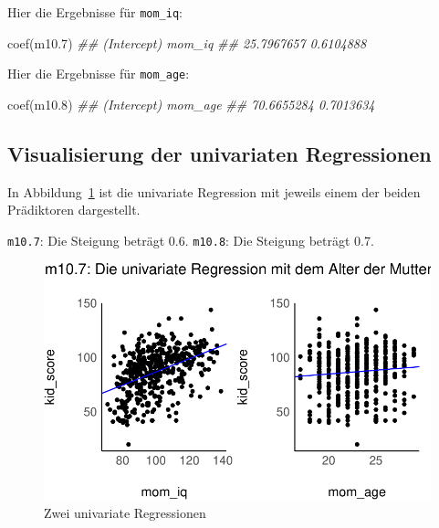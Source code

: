 \documentclass[
  a4paper,
  DIV=11]{scrreprt}
\newenvironment{Shaded}{\begin{snugshade}}{\end{snugshade}}
\newcommand{\DocumentationTok}[1]{\textcolor[rgb]{0.37,0.37,0.37}{\textit{#1}}}
\newcommand{\FloatTok}[1]{\textcolor[rgb]{0.68,0.00,0.00}{#1}}
\newcommand{\FunctionTok}[1]{\textcolor[rgb]{0.28,0.35,0.67}{#1}}
\newcommand{\NormalTok}[1]{\textcolor[rgb]{0.00,0.23,0.31}{#1}}
\theoremstyle{definition}
\theoremstyle{remark}
\begin{document}
Hier die Ergebnisse für \texttt{mom\_iq}:

\begin{Shaded}
\begin{Highlighting}[]
\FunctionTok{coef}\NormalTok{(m10}\FloatTok{.7}\NormalTok{)}
\DocumentationTok{\#\# (Intercept)      mom\_iq }
\DocumentationTok{\#\#  25.7967657   0.6104888}
\end{Highlighting}
\end{Shaded}

Hier die Ergebnisse für \texttt{mom\_age}:

\begin{Shaded}
\begin{Highlighting}[]
\FunctionTok{coef}\NormalTok{(m10}\FloatTok{.8}\NormalTok{)}
\DocumentationTok{\#\# (Intercept)     mom\_age }
\DocumentationTok{\#\#  70.6655284   0.7013634}
\end{Highlighting}
\end{Shaded}

\hypertarget{visualisierung-der-univariaten-regressionen}{%
\subsection{Visualisierung der univariaten
Regressionen}\label{visualisierung-der-univariaten-regressionen}}

In Abbildung~\ref{fig-regr-one-pred} ist die univariate Regression mit
jeweils einem der beiden Prädiktoren dargestellt.

\texttt{m10.7}: Die Steigung beträgt 0.6. \texttt{m10.8}: Die Steigung
beträgt 0.7.

\begin{figure}

{\centering \includegraphics{./metrische-AV_files/figure-pdf/fig-regr-one-pred-1.pdf}

}

\caption{\label{fig-regr-one-pred}Zwei univariate Regressionen}

\end{figure}
\end{document}
